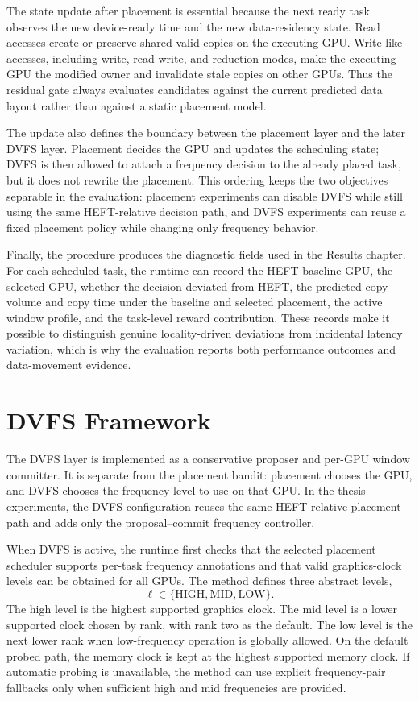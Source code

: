 The state update after placement is essential because the next ready task observes the new device-ready time and the new data-residency state. Read accesses create or preserve shared valid copies on the executing GPU. Write-like accesses, including write, read-write, and reduction modes, make the executing GPU the modified owner and invalidate stale copies on other GPUs. Thus the residual gate always evaluates candidates against the current predicted data layout rather than against a static placement model.

The update also defines the boundary between the placement layer and the later DVFS layer. Placement decides the GPU and updates the scheduling state; DVFS is then allowed to attach a frequency decision to the already placed task, but it does not rewrite the placement. This ordering keeps the two objectives separable in the evaluation: placement experiments can disable DVFS while still using the same HEFT-relative decision path, and DVFS experiments can reuse a fixed placement policy while changing only frequency behavior.

Finally, the procedure produces the diagnostic fields used in the Results chapter. For each scheduled task, the runtime can record the HEFT baseline GPU, the selected GPU, whether the decision deviated from HEFT, the predicted copy volume and copy time under the baseline and selected placement, the active window profile, and the task-level reward contribution. These records make it possible to distinguish genuine locality-driven deviations from incidental latency variation, which is why the evaluation reports both performance outcomes and data-movement evidence.

\section{DVFS Framework}
\label{sec:methods-dvfs-framework}

The DVFS layer is implemented as a conservative proposer and per-GPU window committer. It is separate from the placement bandit: placement chooses the GPU, and DVFS chooses the frequency level to use on that GPU. In the thesis experiments, the DVFS configuration reuses the same HEFT-relative placement path and adds only the proposal--commit frequency controller.

When DVFS is active, the runtime first checks that the selected placement scheduler supports per-task frequency annotations and that valid graphics-clock levels can be obtained for all GPUs. The method defines three abstract levels,
\begin{equation}
\ell\in\{\mathrm{HIGH},\mathrm{MID},\mathrm{LOW}\}.
\end{equation}
The high level is the highest supported graphics clock. The mid level is a lower supported clock chosen by rank, with rank two as the default. The low level is the next lower rank when low-frequency operation is globally allowed. On the default probed path, the memory clock is kept at the highest supported memory clock. If automatic probing is unavailable, the method can use explicit frequency-pair fallbacks only when sufficient high and mid frequencies are provided.

